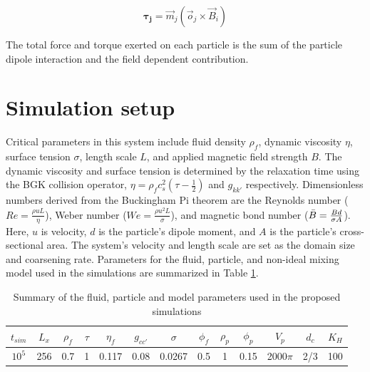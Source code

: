 \begin{equation}
    \mathbf{\tau_j} = \vec{m}_{j}(\vec{o}_{j} \times \vec{B}_{i})
    \label{eq:magnet_torque}
\end{equation}

The total force and torque exerted on each particle is the sum of the particle dipole interaction and the field 
dependent contribution. 

\section{Simulation setup}
\label{section:sim_setup}

Critical parameters in this system include fluid density $\rho_f$, dynamic viscosity $\eta$, surface tension $\sigma$, 
length scale $L$, and applied magnetic field strength $B$. The dynamic viscosity and surface tension is determined 
by the relaxation time using the BGK collision operator, $\eta = \rho_f c_s^2(\tau - \frac{1}{2})$ and $g_{kk'}$ 
respectively. Dimensionless numbers derived from the Buckingham Pi theorem are the Reynolds number
($Re = \frac{\rho u L}{\eta}$), Weber number ($We = \frac{\rho u^2 L}{\sigma}$), and magnetic bond number 
($\Bar{B} = \frac{Bd}{\sigma A}$). Here, $u$ is velocity, $d$ is the particle's dipole moment, and $A$ is the 
particle's cross-sectional area. The system's velocity and length scale are set as the domain size and coarsening rate. 
Parameters for the fluid, particle, and non-ideal mixing model used in the simulations are summarized in Table 
\ref{table:model_params}.

\begin{table}[h!]
\centering
\begin{tabular}{||c c c c c c c c c c c c c||} 
 \hline
 $t_{sim}$ & $L_x$ & $\rho_f$ & $\tau$ & $\eta_f$ & $g_{cc'}$ & $\sigma$ & $\phi_f$ & $\rho_p$ & $\phi_p$ & $V_p$ & $d_c$ & $K_H$ \\ [0.5ex] 
 \hline\hline
 $10^5$ & 256 & 0.7 & 1 & 0.117 & 0.08 & 0.0267 & 0.5 & 1 & 0.15 & 2000$\pi$ & 2/3 & 100\\ [1ex] 
 \hline
\end{tabular}
\caption{Summary of the fluid, particle and model parameters used in the proposed simulations}
\label{table:model_params}
\end{table}

